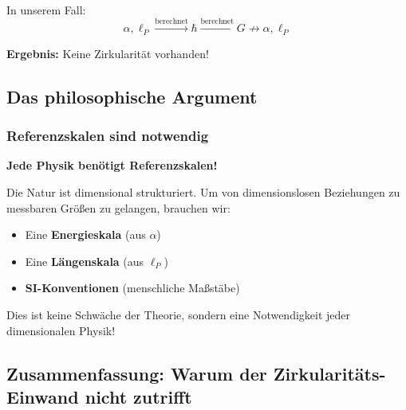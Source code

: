 \documentclass[12pt,a4paper]{article}
\theoremstyle{definition}
\begin{document}
	In unserem Fall:
	\begin{equation}
		\alpha, \ell_P \xrightarrow{\text{berechnet}} \hbar \xrightarrow{\text{berechnet}} G \not\rightarrow \alpha, \ell_P
	\end{equation}
	
	\textbf{Ergebnis:} Keine Zirkularit\"at vorhanden!
	
	\subsection{Das philosophische Argument}
	
	\subsubsection{Referenzskalen sind notwendig}
	
	\begin{tcolorbox}[colback=blue!5!white,colframe=blue!75!black,title=Fundamentale Erkenntnis]
		\textbf{Jede Physik ben\"otigt Referenzskalen!}
		
		Die Natur ist dimensional strukturiert. Um von dimensionslosen Beziehungen zu messbaren Gr\"o\ss{}en zu gelangen, brauchen wir:
		\begin{itemize}
			\item Eine \textbf{Energieskala} (aus $\alpha$)
			\item Eine \textbf{L\"angenskala} (aus $\ell_P$) 
			\item \textbf{SI-Konventionen} (menschliche Ma\ss{}st\"abe)
		\end{itemize}
		
		Dies ist keine Schw\"ache der Theorie, sondern eine Notwendigkeit jeder dimensionalen Physik!
	\end{tcolorbox}
	
	\subsection{Zusammenfassung: Warum der Zirkularit\"ats-Einwand nicht zutrifft}
	
\end{document}
